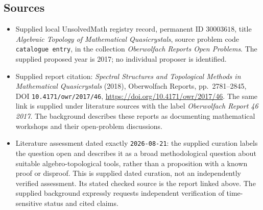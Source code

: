 \documentclass[11pt]{article}
\begin{document}
\subsection{Sources}
\begin{itemize}
\item Supplied local UnsolvedMath registry record, permanent ID \(30003618\), title \emph{Algebraic Topology of Mathematical Quasicrystals}, source problem code \texttt{catalogue entry}, in the collection \emph{Oberwolfach Reports Open Problems}. The supplied proposed year is 2017; no individual proposer is identified.
\item Supplied report citation: \emph{Spectral Structures and Topological Methods in Mathematical Quasicrystals} (2018), Oberwolfach Reports, pp.~2781--2845, DOI \texttt{10.4171/owr/2017/46}, \url{https://doi.org/10.4171/owr/2017/46}. The same link is supplied under literature sources with the label \emph{Oberwolfach Report 46 2017}. The background describes these reports as documenting mathematical workshops and their open-problem discussions.
\item Literature assessment dated exactly \texttt{2026-08-21}: the supplied curation labels the question open and describes it as a broad methodological question about suitable algebro-topological tools, rather than a proposition with a known proof or disproof. This is supplied dated curation, not an independently verified assessment. Its stated checked source is the report linked above. The supplied background expressly requests independent verification of time-sensitive status and cited claims.
\end{itemize}
\end{document}
